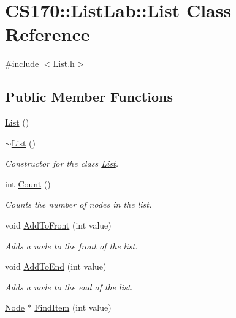 \hypertarget{class_c_s170_1_1_list_lab_1_1_list}{\section{C\-S170\-:\-:List\-Lab\-:\-:List Class Reference}
\label{class_c_s170_1_1_list_lab_1_1_list}
}


{\ttfamily \#include $<$List.\-h$>$}

\subsection*{Public Member Functions}
\begin{DoxyCompactItemize}
\item 
\hyperlink{class_c_s170_1_1_list_lab_1_1_list_a566a254e6b12cebbb651ad3f9b344c2d}{List} ()
\item 
\hyperlink{class_c_s170_1_1_list_lab_1_1_list_aae0901e613999c253b0bf05a619f32ad}{$\sim$\-List} ()
\begin{DoxyCompactList}\small\item\em Constructor for the class \hyperlink{class_c_s170_1_1_list_lab_1_1_list}{List}. \end{DoxyCompactList}\item 
int \hyperlink{class_c_s170_1_1_list_lab_1_1_list_abbfb73ea737ec4b8c7addd601d8a85f9}{Count} ()
\begin{DoxyCompactList}\small\item\em Counts the number of nodes in the list. \end{DoxyCompactList}\item 
void \hyperlink{class_c_s170_1_1_list_lab_1_1_list_ae0d1edbf73012bb977c8e332667fb592}{Add\-To\-Front} (int value)
\begin{DoxyCompactList}\small\item\em Adds a node to the front of the list. \end{DoxyCompactList}\item 
void \hyperlink{class_c_s170_1_1_list_lab_1_1_list_a54d4c8da98dee27d5d837211b9920a88}{Add\-To\-End} (int value)
\begin{DoxyCompactList}\small\item\em Adds a node to the end of the list. \end{DoxyCompactList}\item 
\hyperlink{struct_c_s170_1_1_list_lab_1_1_node}{Node} $\ast$ \hyperlink{class_c_s170_1_1_list_lab_1_1_list_a81fbb05c8b2576d0e9eb08e56c872129}{Find\-Item} (int value)

\end{DoxyCompactItemize}
